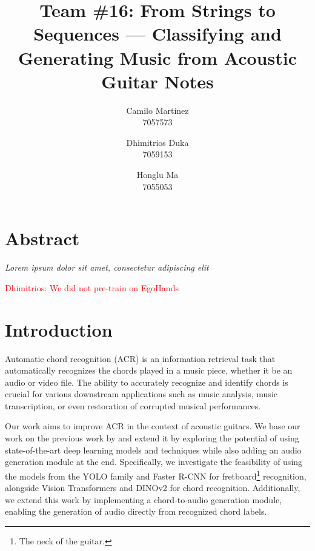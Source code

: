 \documentclass[10pt,twocolumn,letterpaper]{article}
\begin{document}
\newcommand{\dhimitrios}[1]{\textcolor{red}{Dhimitrios: #1}}

\title{Team \#16: From Strings to Sequences --- Classifying and Generating Music from Acoustic Guitar Notes}


\author{
  Camilo Martínez\\
  7057573\\
  \and
  Dhimitrios Duka\\
  7059153\\
  \and
  Honglu Ma\\
  7055053\\
}
\maketitle

\section{Abstract}
\emph{Lorem ipsum dolor sit amet, consectetur adipiscing elit}

\dhimitrios{We did not pre-train on EgoHands}

\section{Introduction}
Automatic chord recognition (ACR) is an information retrieval task that automatically recognizes the chords played in a music piece, whether it be an audio or video file. The ability to accurately recognize and identify chords is crucial for various downstream applications such as music analysis, music transcription, or even restoration of corrupted musical performances. 

Our work aims to improve ACR in the context of acoustic guitars. We base our work on the previous work by \cite{Kristian_Zaman_Tenoyo_Jodhinata_2024} and extend it by exploring the potential of using state-of-the-art deep learning models and techniques while also adding an audio generation module at the end. Specifically, we investigate the feasibility of using the models from the YOLO \cite{redmon2016you} family and Faster R-CNN \cite{ren2016faster} for fretboard\footnote{The neck of the guitar.} recognition, alongside Vision Transformers \cite{dosovitskiy2020image} and DINOv2 \cite{oquab2023dinov2} for chord recognition. Additionally, we extend this work by implementing a chord-to-audio generation module, enabling the generation of audio directly from recognized chord labels.
\end{document}

